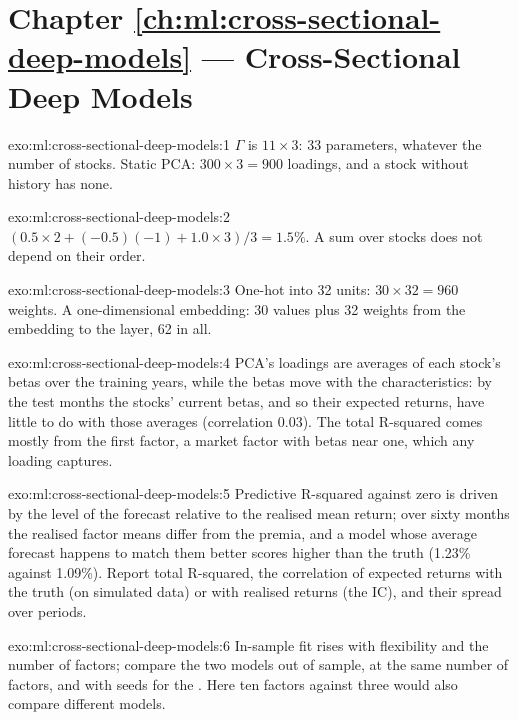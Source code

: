 \section*{Chapter \ref{ch:ml:cross-sectional-deep-models} --- Cross-Sectional Deep Models}

\begin{solution}{exo:ml:cross-sectional-deep-models:1}
$\Gamma$ is $11\times3$: 33 parameters, whatever the number of stocks. Static PCA: $300\times3 = 900$ loadings, and a stock
without history has none.
\end{solution}

\begin{solution}{exo:ml:cross-sectional-deep-models:2}
$(0.5\times2 + (-0.5)(-1) + 1.0\times3)/3 = 1.5\%$. A sum over stocks does not depend on their order.
\end{solution}

\begin{solution}{exo:ml:cross-sectional-deep-models:3}
One-hot into 32 units: $30\times32 = 960$ weights. A one-dimensional embedding: 30 values plus 32 weights from the
embedding to the layer, 62 in all.
\end{solution}

\begin{solution}{exo:ml:cross-sectional-deep-models:4}
PCA's loadings are averages of each stock's betas over the training years, while the betas move with the characteristics:
by the test months the stocks' current betas, and so their expected returns, have little to do with those averages
(correlation 0.03). The total R-squared comes mostly from the first factor, a market factor with betas near one, which any
loading captures.
\end{solution}

\begin{solution}{exo:ml:cross-sectional-deep-models:5}
Predictive R-squared against zero is driven by the level of the forecast relative to the realised mean return; over sixty
months the realised factor means differ from the premia, and a model whose average forecast happens to match them better
scores higher than the truth (1.23\% against 1.09\%). Report total R-squared, the correlation of expected returns with the
truth (on simulated data) or with realised returns (the IC), and their spread over periods.
\end{solution}

\begin{solution}{exo:ml:cross-sectional-deep-models:6}
In-sample fit rises with flexibility and the number of factors; compare the two models out of sample, at the same number
of factors, and with seeds for the . Here ten factors against three would also compare different models.
\end{solution}

